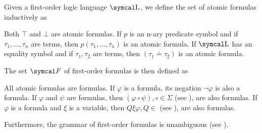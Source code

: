 \begin{definition}\label{def:first_order_formula}
  Given a first-order logic language \( \CL \), we define the set of atomic formulas inductively as
  \begin{itemize}
     Both \( \top \) and \( \bot \) are atomic formulas.
     If \( p \) is an n-ary predicate symbol and if \( \tau_1, \ldots, \tau_n \) are terms, then \( p(\tau_1, \ldots, \tau_n) \) is an atomic formula.
     If \( \CL \) has an equality symbol and if \( \tau_1, \tau_2 \) are terms, then \( (\tau_1 \doteq \tau_2) \) is an atomic formula.
  \end{itemize}

  The set \( \Cal{F} \) of first-order formulas is then defined as
  \begin{itemize}
     All atomic formulas are formulas.
     If \( \varphi \) is a formula, its negation \( \neg \varphi \) is also a formula.
     If \( \varphi \) and \( \psi \) are formulas, then \( (\varphi \circ \psi), \circ \in \Sigma \) (see ), are also formulas.
     If \( \varphi \) is a formula and \( \xi \) is a variable, then \( Q \xi \varphi, Q \in  \) (see ), are also formulas.
  \end{itemize}

  Furthermore, the grammar of first-order formulas is unambiguous (see ).


\end{definition}

